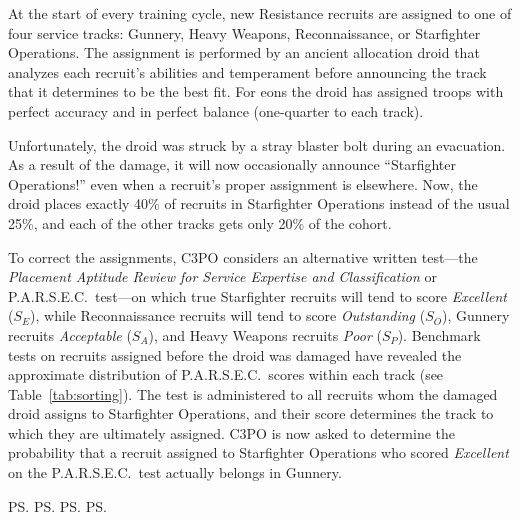 \label{ex:assign}
At the start of every training cycle, new Resistance recruits are assigned to one of four service tracks: Gunnery, Heavy Weapons, Reconnaissance, or Starfighter Operations. The assignment is performed by an ancient allocation droid that analyzes each recruit's abilities and temperament before announcing the track that it determines to be the best fit. For eons the droid has assigned troops with perfect accuracy and in perfect balance (one-quarter to each track).

Unfortunately, the droid was struck by a stray blaster bolt during an evacuation. As a result of the damage, it will now occasionally announce ``Starfighter Operations!'' even when a recruit's proper assignment is elsewhere. Now, the droid places exactly 40\% of recruits in Starfighter Operations instead of the usual 25\%, and each of the other tracks gets only 20\% of the cohort.

To correct the assignments, C3PO considers an alternative written test---the \emph{Placement Aptitude Review for Service Expertise and Classification} or P.A.R.S.E.C.\ test---on which true Starfighter recruits will tend to score \emph{Excellent} ($S_E$), while Reconnaissance recruits will tend to score \emph{Outstanding} ($S_O$), Gunnery recruits \emph{Acceptable} ($S_A$), and Heavy Weapons recruits \emph{Poor} ($S_P$). Benchmark tests on recruits assigned before the droid was damaged have revealed the approximate distribution of P.A.R.S.E.C.\ scores within each track (see Table~\ref{tab:sorting}). The test is administered to all recruits whom the damaged droid assigns to Starfighter Operations, and their score determines the track to which they are ultimately assigned. C3PO is now asked to determine the probability that a recruit assigned to Starfighter Operations who scored \emph{Excellent} on the P.A.R.S.E.C.\ test actually belongs in Gunnery.

     
     
     
     

   
   
   
   

\FPeval{\jsse} {\ps*\pes*\pss}  %
\FPeval{\jgse} {\pg*\peg*\psg}  %
\FPeval{\jrse} {\pr*\per*\psr}  %
\FPeval{\jhse} {\ph*\peh*\psh}  %
\FPeval{\jsso} {\ps*\pos*\pss}  %
\FPeval{\jgso} {\pg*\pog*\psg}  %
\FPeval{\jrso} {\pr*\por*\psr}  %
\FPeval{\jhso} {\ph*\poh*\psh}  %
\FPeval{\jssa} {\ps*\pas*\pss}  %
\FPeval{\jgsa} {\pg*\pag*\psg}  %
\FPeval{\jrsa} {\pr*\parr*\psr} %
\FPeval{\jhsa} {\ph*\pah*\psh}  %
\FPeval{\jssp} {\ps*\pps*\pss}  %
\FPeval{\jgsp} {\pg*\ppg*\psg}  %
\FPeval{\jrsp} {\pr*\ppr*\psr}  %
\FPeval{\jhsp} {\ph*\pph*\psh}  %

